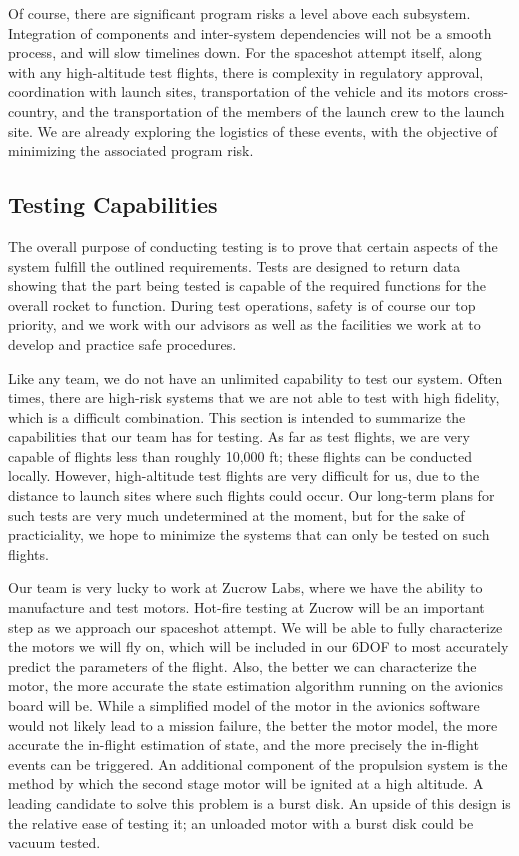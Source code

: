 Of course, there are significant program risks a level above each subsystem. Integration of components and inter-system dependencies will not be a smooth process, and will slow timelines down. For the spaceshot attempt itself, along with any high-altitude test flights, there is complexity in regulatory approval, coordination with launch sites, transportation of the vehicle and its motors cross-country, and the transportation of the members of the launch crew to the launch site. We are already exploring the logistics of these events, with the objective of minimizing the associated program risk.



\subsection{Testing Capabilities}
The overall purpose of conducting testing is to prove that certain aspects of the system fulfill the outlined requirements. Tests are designed to return data showing that the part being tested is capable of the required functions for the overall rocket to function. During test operations, safety is of course our top priority, and we work with our advisors as well as the facilities we work at to develop and practice safe procedures.

Like any team, we do not have an unlimited capability to test our system. Often times, there are high-risk systems that we are not able to test with high fidelity, which is a difficult combination. This section is intended to summarize the capabilities that our team has for testing. As far as test flights, we are very capable of flights less than roughly 10,000 ft; these flights can be conducted locally. However, high-altitude test flights are very difficult for us, due to the distance to launch sites where such flights could occur. Our long-term plans for such tests are very much undetermined at the moment, but for the sake of practiciality, we hope to minimize the systems that can only be tested on such flights.

Our team is very lucky to work at Zucrow Labs, where we have the ability to manufacture and test motors. Hot-fire testing at Zucrow will be an important step as we approach our spaceshot attempt. We will be able to fully characterize the motors we will fly on, which will be included in our 6DOF to most accurately predict the parameters of the flight. Also, the better we can characterize the motor, the more accurate the state estimation algorithm running on the avionics board will be. While a simplified model of the motor in the avionics software would not likely lead to a mission failure, the better the motor model, the more accurate the in-flight estimation of state, and the more precisely the in-flight events can be triggered. An additional component of the propulsion system is the method by which the second stage motor will be ignited at a high altitude. A leading candidate to solve this problem is a burst disk. An upside of this design is the relative ease of testing it; an unloaded motor with a burst disk could be vacuum tested.


